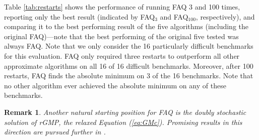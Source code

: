 \documentclass[10pt]{article}
\newtheorem{rem}{Remark}
\begin{document}
Table \ref{tab:restarts} shows the performance of running FAQ 3 and 100 times, reporting only the best result (indicated by FAQ$_3$ and FAQ$_{100}$, respectively), and comparing it to the best performing result of the five algorithms 
(including the original FAQ)---note that the best performing of the original five tested was always FAQ. Note that we only consider the 16 particularly difficult benchmarks for this evaluation. FAQ only required three restarts to outperform all other approximate algorithms on all 16 of 16 difficult benchmarks.  Moreover, after 100 restarts, FAQ finds the absolute minimum on 3 of the 16 benchmarks.  Note that no other algorithm ever achieved the absolute minimum on any of these benchmarks. 

\begin{rem}
\emph{Another natural starting position for FAQ is the doubly stochastic solution of rGMP, the relaxed Equation (\ref{eq:GMc}).  Promising results in this direction are pursued further in \cite{lyzinski2014graph}.}
\end{rem}
\end{document}

